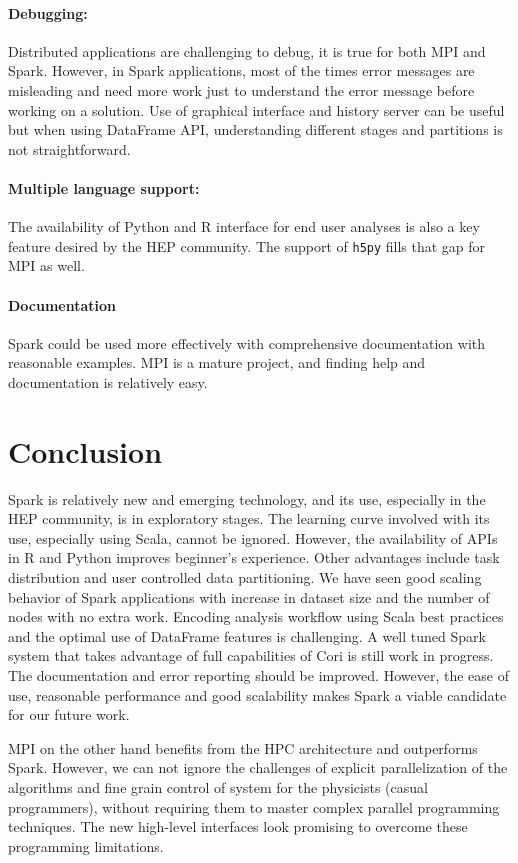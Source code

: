 \documentclass[10pt, twocolumn]{article}
\newcommand{\squeezeup}{\vspace{-5.5mm}}
\begin{document}
\paragraph{Debugging: } 
Distributed applications are challenging to debug, it is true for both MPI and Spark. 
However, in Spark applications, 
most of the times error messages are misleading and need more work
just to understand the error message before working on
a solution. Use of graphical interface and history server can
be useful but when using DataFrame API, understanding
different stages and partitions is not straightforward. 
\squeezeup
\paragraph{Multiple language support: }
The availability of Python and R interface for end user analyses is also a key feature desired by the HEP community. 
The support of  \texttt{h5py} fills that gap for MPI as well. 
\squeezeup
\paragraph{Documentation} 
Spark could be used more effectively with comprehensive documentation with 
reasonable examples. 
MPI is a mature project, and finding help and documentation is relatively easy. 
\squeezeup
\section{Conclusion}
Spark is relatively new and emerging technology, and its use, especially 
in the HEP community, is in exploratory stages. The learning curve involved 
with its use, especially using Scala, cannot be ignored. However, the availability 
of APIs in R and Python improves beginner's experience. 
Other advantages include task distribution and user controlled 
data partitioning. We have seen good scaling behavior of Spark applications 
with increase in dataset size and the number of nodes with no extra work. 
Encoding analysis workflow using Scala best practices and the optimal 
use of DataFrame features is challenging. 
A well tuned Spark system that takes advantage of full capabilities of Cori is still work in progress. 
The documentation and error reporting should be improved. However, the ease of use, 
reasonable performance and good scalability makes Spark a viable candidate for our future work.

MPI on the other hand benefits from the HPC architecture and outperforms Spark. However, we can not 
ignore the challenges of explicit parallelization of the algorithms and fine grain control of system for the physicists (casual programmers), 
without requiring them to master complex parallel programming techniques. 
The new high-level interfaces look promising to overcome these programming limitations. 
 
\end{document}
